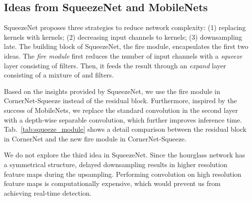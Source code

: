 \documentclass{bmvc2k}
\begin{document}
\subsection{Ideas from SqueezeNet and MobileNets}
SqueezeNet proposes three strategies to reduce network complexity: (1) replacing  kernels with  kernels; (2) decreasing input channels to  kernels; (3) downsampling late. The building block of SqueezeNet, the fire module, encapsulates the first two ideas. The \textit{fire module} first reduces the number of input channels with a \textit{squeeze} layer consisting of  filters. Then, it feeds the result through an \textit{expand} layer consisting of a mixture of  and  filters.

Based on the insights provided by SqueezeNet, we use the fire module in CornerNet-Squeeze instead of the residual block. Furthermore, inspired by the success of MobileNets, we replace the  standard convolution in the second layer with a  depth-wise separable convolution, which further improves inference time. Tab.~\ref{tab:squeeze_module} shows a detail comparison between the residual block in CornerNet and the new fire module in CornerNet-Squeeze. 

We do not explore the third idea in SqueezeNet. Since the hourglass network has a symmetrical structure, delayed downsampling results in higher resolution feature maps during the upsampling. Performing convolution on high resolution feature maps is computationally expensive, which would prevent us from achieving real-time detection.

\begin{table}[ht]
    \centering
    \def\arraystretch{1.1}
    \caption{Comparison between the residual block and the new fire module.}
    \label{tab:squeeze_module}
\end{table}
\end{document}
